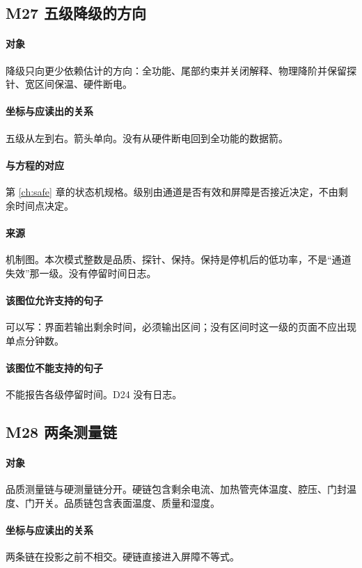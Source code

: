 \subsection{M27 五级降级的方向}
\paragraph{对象}
降级只向更少依赖估计的方向：全功能、尾部约束并关闭解释、物理降阶并保留探针、宽区间保温、硬件断电。

\paragraph{坐标与应读出的关系}
五级从左到右。箭头单向。没有从硬件断电回到全功能的数据箭。

\paragraph{与方程的对应}
第 \ref{ch:safe} 章的状态机规格。级别由通道是否有效和屏障是否接近决定，不由剩余时间点决定。

\paragraph{来源}
机制图。本次模式整数是品质、探针、保持。保持是停机后的低功率，不是“通道失效”那一级。没有停留时间日志。

\paragraph{该图位允许支持的句子}
可以写：界面若输出剩余时间，必须输出区间；没有区间时这一级的页面不应出现单点分钟数。

\paragraph{该图位不能支持的句子}
不能报告各级停留时间。D24 没有日志。

\subsection{M28 两条测量链}
\paragraph{对象}
品质测量链与硬测量链分开。硬链包含剩余电流、加热管壳体温度、腔压、门封温度、门开关。品质链包含表面温度、质量和湿度。

\paragraph{坐标与应读出的关系}
两条链在投影之前不相交。硬链直接进入屏障不等式。

